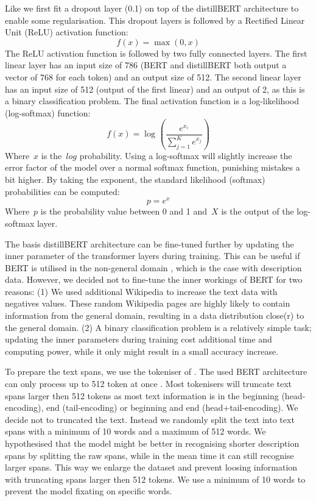 \documentclass[a4paper, 12pt, oneside]{book} %
\begin{document}
Like \textcite{sun_how_2020} we first fit a dropout layer (0.1) on top of the distillBERT architecture to enable some regularisation.
This dropout layers is followed by a Rectified Linear Unit (ReLU) activation function:
\begin{equation} \label{ReLU}
    f(x) = \max(0, x)
\end{equation}
The ReLU activation function is followed by two fully connected layers.
The first linear layer has an input size of 786 (BERT and distillBERT both output a vector of 768 for each token) and an output size of 512.
The second linear layer has an input size of 512 (output of the first linear) and an output of 2, as this is a binary classification problem.
The final activation function is a log-likelihood (log-softmax) function:
\begin{equation} \label{eq:logsoftmax}
    f(x) = \log_{}(\frac{e^{x_i}}{\sum_{j=1}^K e^{x_j}})
\end{equation}
Where~$x$ is the~$log$ probability.
Using a log-softmax will slightly increase the error factor of the model over a normal softmax function, punishing mistakes a bit higher.
By taking the exponent, the standard likelihood (softmax) probabilities can be computed:
\begin{equation}
    p = e^{x} 
\end{equation}
Where~$p$ is the probability value between 0 and 1 and~$X$ is the output of the log-softmax layer.

The basis distillBERT architecture can be fine-tuned further by updating the inner parameter of the transformer layers during training. 
This can be useful if BERT is utilised in the non-general domain \autocite{devlin_bert_2019, sun_how_2020, sanh_distilbert_2020}, which is the case with description data.
However, we decided not to fine-tune the inner workings of BERT for two reasons: 
(1) We used additional Wikipedia to increase the text data with negatives values.
These random Wikipedia pages are highly likely to contain information from the general
domain, resulting in a  data distribution close(r) to the general domain.
(2) A binary classification problem is a relatively simple task; updating the inner parameters during training cost additional time and computing power, while it only might result in a small accuracy increase.

To prepare the text spans, we use the tokeniser of \textcite{wolf_huggingfaces_2020}.
The used BERT architecture can only process up to 512 token at once \autocite{sanh_distilbert_2020, devlin_bert_2019}.
Most tokenisers will truncate text spans larger then 512 tokens as most text information is in the beginning (head-encoding), end (tail-encoding) or beginning and end (head+tail-encoding).
We decide not to truncated the text.
Instead we randomly split the text into text spans with a minimum of 10 words and a maximum of 512 words.
We hypothesised that the model might be better in recognising shorter description spans by splitting the raw spans, while in the mean time it can still recognise larger spans.  
This way we enlarge the dataset and prevent loosing information with truncating spans larger then 512 tokens. 
We use a minimum of 10 words to prevent the model fixating on specific words.
\end{document}

